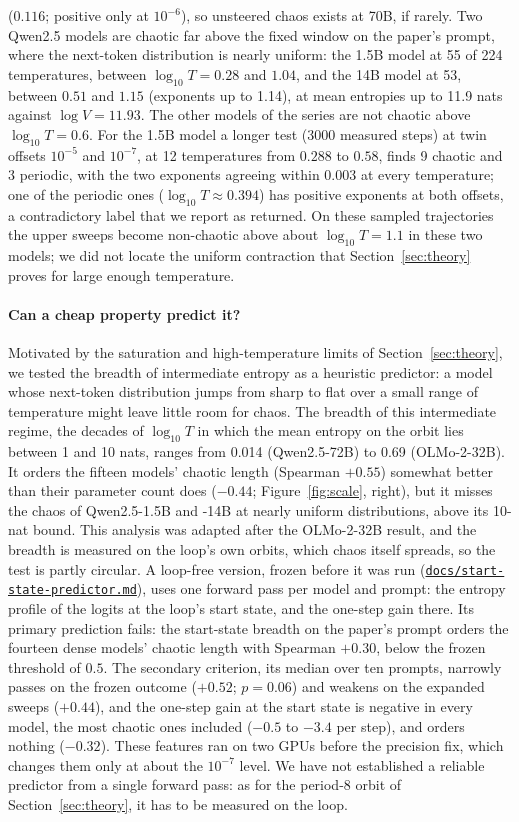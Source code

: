 \documentclass[11pt,letterpaper]{article}
\newcommand{\repourl}{https://github.com/tdj28/neural-shrimp}
\newcommand{\reporef}{arxiv-v1}
\newcommand{\repo}[1]{\href{\repourl/blob/\reporef/#1}{\nolinkurl{#1}}}
\begin{document}
($0.116$; positive only at $10^{-6}$), so unsteered chaos exists at 70B, if rarely. Two Qwen2.5 models are chaotic far above the
fixed window on the paper's prompt, where the next-token distribution is nearly uniform: the 1.5B model at 55 of 224
temperatures, between $\log_{10}T=0.28$ and $1.04$, and the 14B model at 53, between $0.51$ and $1.15$ (exponents up to 1.14), at mean
entropies up to 11.9 nats against $\log V=11.93$. The other models of the series are not chaotic above
$\log_{10}T=0.6$. For the 1.5B model a longer test (3000 measured steps) at twin offsets $10^{-5}$ and $10^{-7}$, at 12
temperatures from $0.288$ to $0.58$, finds 9 chaotic and 3 periodic, with the two exponents agreeing within 0.003 at
every temperature; one of the periodic ones ($\log_{10}T\approx0.394$) has positive exponents at both offsets, a
contradictory label that we report as returned. On these sampled trajectories the upper sweeps become non-chaotic
above about $\log_{10}T=1.1$ in these two models; we did not locate the uniform contraction that
Section~\ref{sec:theory} proves for large enough temperature.

\paragraph{Can a cheap property predict it?} Motivated by the saturation and high-temperature limits of
Section~\ref{sec:theory}, we tested the breadth of intermediate entropy as a heuristic predictor: a model whose
next-token distribution jumps from sharp to flat over a small range of temperature might leave little room for
chaos. The breadth of this intermediate regime, the decades of
$\log_{10}T$ in which the mean entropy on the orbit lies between 1 and 10 nats, ranges from 0.014 (Qwen2.5-72B) to
0.69 (OLMo-2-32B). It orders the fifteen models' chaotic length (Spearman $+0.55$) somewhat better than their parameter
count does ($-0.44$; Figure~\ref{fig:scale}, right), but it misses the chaos of Qwen2.5-1.5B and -14B at nearly
uniform distributions, above its 10-nat bound. This analysis was adapted after the OLMo-2-32B result, and the breadth
is measured on the loop's own orbits, which chaos itself spreads, so the test is partly circular. A loop-free version,
frozen before it was run (\repo{docs/start-state-predictor.md}), uses one forward pass per model and prompt: the
entropy profile of the logits at the loop's start state, and the one-step gain there. Its primary prediction fails: the
start-state breadth on the paper's prompt orders the fourteen dense models' chaotic length with Spearman $+0.30$,
below the frozen threshold of $0.5$. The secondary criterion, its median over ten prompts, narrowly passes on the
frozen outcome ($+0.52$; $p=0.06$) and weakens on the expanded sweeps ($+0.44$), and the one-step gain at the start
state is negative in every model, the most chaotic ones included ($-0.5$ to $-3.4$ per step), and orders nothing
($-0.32$). These features ran on two GPUs before the precision fix, which changes them only at about the
$10^{-7}$ level. We have not established a reliable predictor from a single forward pass: as for the period-8 orbit of Section~\ref{sec:theory}, it has to be measured
on the loop.
\end{document}
